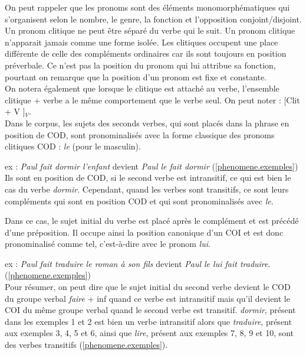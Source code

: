 On peut rappeler que les pronoms sont des éléments monomorphématiques qui s'organisent selon le nombre, le genre, la fonction et l'opposition conjoint/disjoint.
Un pronom clitique ne peut être séparé du verbe qui le suit.
Un pronom clitique n'apparait jamais comme une forme isolée.
Les clitiques occupent une place différente de celle des compléments ordinaires car ils sont toujours en position préverbale.
Ce n'est pas la position du pronom qui lui attribue sa fonction, pourtant on remarque que la position d'un pronom est fixe et constante.\\

On notera également que lorsque le clitique est attaché au verbe, l'ensemble clitique + verbe a le même comportement que le verbe seul.
On peut noter : [Clit + V ]$_V$.\\

Dans le corpus, les sujets des seconds verbes, qui sont placés dans la phrase en position de COD, sont pronominalisés avec la forme classique des pronoms clitiques COD : \emph{le} (pour le masculin).

ex : \emph{Paul fait dormir l'enfant} devient \emph{Paul le fait dormir} (\autoref{phenomene.exemples})\\

Ils sont en position de COD, si le second verbe est intransitif, ce qui est bien le cas du verbe \emph{dormir}.
Cependant, quand les verbes sont transitifs, ce sont leurs compléments qui sont en position COD et qui sont pronominalisés avec \emph{le}.

Dans ce cas, le sujet initial du verbe est placé après le complément et est précédé d'une préposition.
Il occupe ainsi la position canonique d'un COI et est donc pronominalisé comme tel, c'est-à-dire avec le pronom \emph{lui}.

ex : \emph{Paul fait traduire le roman à son fils} devient \emph{Paul le lui fait traduire}. (\autoref{phenomene.exemples})\\

Pour résumer, on peut dire que le sujet initial du second verbe devient le COD du groupe verbal \emph{faire} + inf quand ce verbe est intransitif mais qu'il devient le COI du même groupe verbal quand le second verbe est transitif.
\emph{dormir}, présent dans les exemples 1 et 2 est bien un verbe intransitif alors que \emph{traduire}, présent aux exemples 3, 4, 5 et 6, ainsi que \emph{lire}, présent aux exemples 7, 8, 9 et 10, sont des verbes transitifs (\autoref{phenomene.exemples}).

